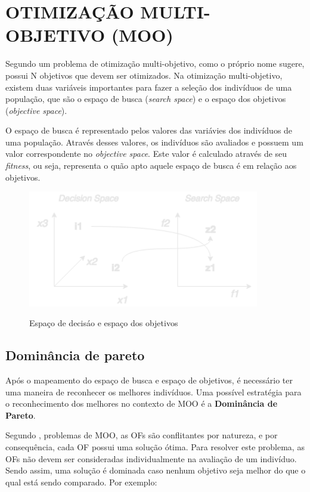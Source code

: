 \section{OTIMIZAÇÃO MULTI-OBJETIVO (MOO)} 
Segundo \cite{ghosh} um problema de otimização multi-objetivo, como
o próprio nome sugere, possui N objetivos que devem ser otimizados. 
Na otimização multi-objetivo, existem duas variáveis importantes
para fazer a seleção dos indivíduos de uma população,
que são o espaço de busca (\textit{search space}) e o 
espaço dos objetivos (\textit{objective space}).

O espaço de busca é representado pelos valores das variávies dos 
indivíduos de uma população. Através desses valores, os indivíduos
são avaliados e possuem um valor correspondente no \textit{objective space}. 
Este valor é calculado através de seu \textit{fitness}, ou seja, representa
o quão apto aquele espaço de busca é em relação aos objetivos.

\begin{figure}[!htb]
  \centering
  \caption{Espaço de decisáo e espaço dos objetivos}
  \includegraphics[width=0.9\textwidth]{./dados/figuras/searchspace-decisionspace.png}
  \label{fig:moospaces}
\end{figure}

\subsection{Dominância de pareto}
Após o mapeamento do espaço de busca e espaço de objetivos, é necessário
ter uma maneira de reconhecer os melhores indivíduos. Uma possível
estratégia para o reconhecimento dos melhores no contexto de MOO 
é a \textbf{Dominância de Pareto}.

Segundo \cite{ghosh}, problemas de MOO, as OFs são conflitantes por natureza, e 
por consequência, cada OF possui uma solução ótima. Para resolver este problema,
as OFs não devem ser consideradas individualmente na avaliação de um indivíduo.
Sendo assim, uma solução é dominada caso nenhum objetivo seja melhor do que
o qual está sendo comparado. Por exemplo:

